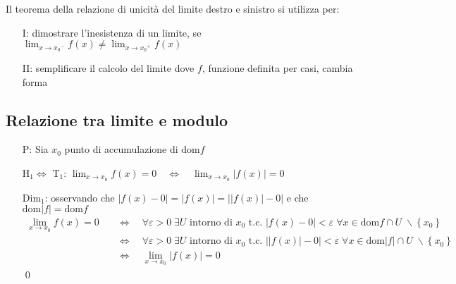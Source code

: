 \documentclass[a4paper]{article}
\newcommand\dom{\text{dom}}
\begin{document}
Il teorema della relazione di unicità del limite destro e sinistro si utilizza per:
\begin{itemize}
	\item[I:] dimostrare l'inesistenza di un limite, se \(\displaystyle \lim_{x \to {x_0}^- } f(x) \neq \lim_{x \to {x_0}^+} f(x)\)
	\item[II:] semplificare il calcolo del limite dove \(f\), funzione definita per casi, cambia forma
\end{itemize}

\subsection{Relazione tra limite e modulo}
\begin{itemize}
	\item[P:] Sia \(x_0\) punto di accumulazione di \(\dom f\)
	\item[H\(_1 \Leftrightarrow\) T\(_1\):] \(\displaystyle \lim_{x \to x_0} f(x) = 0 \quad \Leftrightarrow \quad \lim_{x \to x_0} \left| f(x) \right| = 0\)
	\item[Dim\(_1\):] osservando che \(\left| f(x) - 0 \right| = \left| f(x) \right| = \left| \left| f(x) \right| - 0 \right|\) e che \(\dom \left| f \right| = \dom f\)
	\begin{align*}
		\lim_{x \to x_0} f(x) = 0 \quad &\Leftrightarrow \quad \forall \varepsilon > 0 \; \exists U \text{ intorno di } x_0 \text{ t.c. } \left| f(x) - 0 \right| < \varepsilon \; \forall x \in \dom f \cap U \; \backslash \left\{ x_0 \right\} \\
		&\Leftrightarrow \quad \forall \varepsilon > 0 \; \exists U \text{ intorno di } x_0 \text{ t.c. } \left| \left| f(x) \right| - 0 \right| < \varepsilon \; \forall x \in \dom \left| f \right| \cap U \; \backslash \left\{ x_0 \right\} \\
		&\Leftrightarrow \quad \lim_{x \to x_0} \left| f(x) \right| = 0
	\end{align*} \qed
	

\end{itemize}
\end{document}
